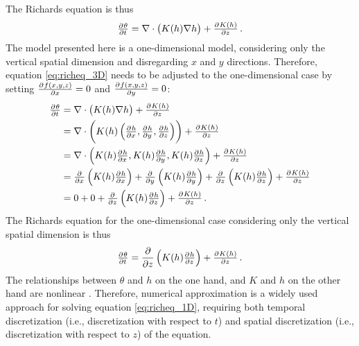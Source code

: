 The Richards equation is thus
\begin{equation}
  \label{eq:richeq_3D}
  \pd{\theta}{t} = \nabla \cdot \del{ K(h) \nabla h } + \pd{K(h)}{z} \, .
\end{equation}
The model presented here is a one-dimensional model, considering only the vertical spatial dimension and disregarding $x$ and $y$ directions.  Therefore, equation \eqref{eq:richeq_3D} needs to be adjusted to the one-dimensional case by setting $\pd{f(x,y,z)}{x} = 0$ and $\pd{f(x,y,z)}{y} = 0$:
\begin{align*}
  \pd{\theta}{t} &= \nabla \cdot \del{ K(h) \nabla h } + \pd{K(h)}{z} \\
                 &= \nabla \cdot \del{ K(h) \del{ \pd{h}{x},\pd{h}{y},\pd{h}{z} } } + \pd{K(h)}{z} \\
                 &= \nabla \cdot \del{ K(h) \pd{h}{x},K(h) \pd{h}{y},K(h) \pd{h}{z} } + \pd{K(h)}{z} \\
                 &= \pd{}{x} \del{ K(h) \pd{h}{x} } + \pd{}{y} \del{ K(h) \pd{h}{y} } + \pd{}{z} \del{ K(h) \pd{h}{z} } + \pd{K(h)}{z} \\
                 &= 0 + 0 + \pd{}{z} \del{ K(h) \pd{h}{z} } + \pd{K(h)}{z} \, .
\end{align*}
The Richards equation for the one-dimensional case considering only the vertical spatial dimension is thus
\begin{equation}
  \label{eq:richeq_1D}
  \pd{\theta}{t} = \frac{\partial}{\partial z} \del{ K(h) \pd{h}{z} } + \pd{K(h)}{z} \, .
\end{equation}
The relationships between $\theta$ and $h$ on the one hand, and $K$ and $h$ on the other hand are nonlinear \parencite{celia_general_1990}.  Therefore, numerical approximation is a widely used approach for solving equation \eqref{eq:richeq_1D}, requiring both temporal discretization (i.e., discretization with respect to $t$) and spatial discretization (i.e., discretization with respect to $z$) of the equation.

